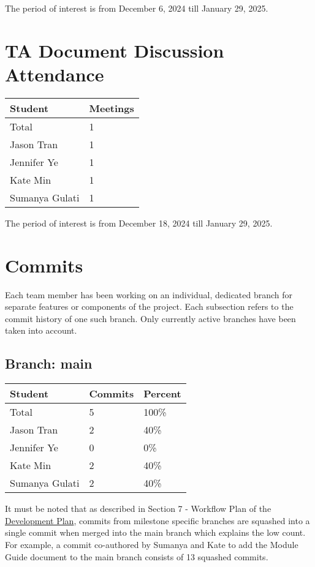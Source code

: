 \documentclass{article}
\begin{document}
The period of interest is from December 6, 2024 till January 29, 2025.

\section{TA Document Discussion Attendance}

\begin{table}[H]
\centering
\begin{tabular}{ll}
\toprule
\textbf{Student} & \textbf{Meetings}\\
\midrule
Total & 1\\
Jason Tran & 1\\
Jennifer Ye & 1\\
Kate Min & 1\\
Sumanya Gulati & 1\\
\bottomrule
\end{tabular}
\end{table}

The period of interest is from December 18, 2024 till January 29, 2025.

\section{Commits}
Each team member has been working on an individual, dedicated branch for separate features or 
components of the project. Each subsection refers to the commit history of one such branch.
Only currently active branches have been taken into account. 

\subsection{Branch: main} \label{sec:main}

\begin{table}[H]
\centering
\begin{tabular}{lll}
\toprule
\textbf{Student} & \textbf{Commits} & \textbf{Percent}\\
\midrule
Total & 5 & 100\% \\
Jason Tran & 2 & 40\% \\
Jennifer Ye & 0 & 0\% \\
Kate Min & 2 & 40\% \\
Sumanya Gulati & 2 & 40\% \\
\bottomrule
\end{tabular}
\end{table}

It must be noted that as described in Section 7 - Workflow Plan of the 
\href{https://github.com/SumanyaG/Alkalytics/blob/main/docs/DevelopmentPlan/DevelopmentPlan.pdf}{Development Plan},
commits from milestone specific branches are squashed into a single commit when merged into the
main branch which explains the low count. For example, a commit co-authored by Sumanya and Kate 
to add the Module Guide document to the main branch consists of 13 squashed commits.\\
\end{document}
